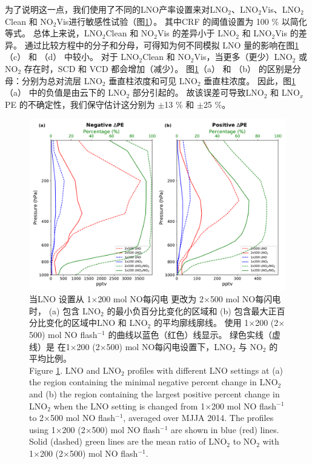为了说明这一点，我们使用了不同的LNO产率设置来对LNO$_2$、LNO$_2$Vis、LNO$_2$Clean 和 NO$_2$Vis进行敏感性试验（图\ref{fig:us_lno2_profile}）。
其中CRF 的阈值设置为 100 \% 以简化等式。
总体上来说，LNO$_2$Clean 和 NO$_2$Vis 的差异小于 LNO$_2$ 和 LNO$_2$Vis 的差异。
通过比较方程中的分子和分母，可得知为何不同模拟 LNO 量的影响在图\ref{fig:us_lno2_profile}（c） 和 （d） 中较小。
对于 LNO$_2$Clean 和 NO$_2$Vis，当更多（更少）LNO$_2$ 或 NO$_2$ 存在时，SCD 和 VCD 都会增加（减少）。
图\ref{fig:us_lno2_profile}（a） 和 （b） 的区别是分母：分别为总对流层 LNO$_2$ 垂直柱浓度和可见 LNO$_2$ 垂直柱浓度。
因此，图\ref{fig:us_lno2_profile}（a） 中的负值是由云下的 LNO$_2$ 部分引起的。
故该误差可导致LNO$_2$ 和 LNO$_x$ PE 的不确定性，我们保守估计这分别为 $\pm$13 \% 和 $\pm$25 \%。

\begin{figure}[!htbp]
\centering
\includegraphics[width=13cm]{./figures/us_lno2_profile.pdf}
\caption{当LNO 设置从 1$\times$200 mol NO每闪电 更改为 2$\times$500 mol NO每闪电 时，
(a) 包含 LNO$_\textrm{2}$ 的最小负百分比变化的区域和 (b) 包含最大正百分比变化的区域中LNO 和 LNO$_\textrm{2}$ 的平均廓线廓线。
使用 1$\times$200 (2$\times$500) mol NO flash$^{-1}$ 的曲线以蓝色（红色）线显示。
绿色实线（虚线）是 在1$\times$200 (2$\times$500) mol NO每闪电设置下，LNO$_\textrm{2}$ 与 NO$_\textrm{2}$ 的平均比例。\\
Figure \ref{fig:us_lno2_profile}. LNO and LNO$_\textrm{2}$ profiles with different LNO settings at (a) the region containing the minimal negative percent change in LNO$_\textrm{2}$ and (b) the region containing the largest positive percent change in LNO$_\textrm{2}$ when the LNO setting is changed from 1$\times$200 mol NO flash$^{-1}$ to 2$\times$500 mol NO flash$^{-1}$, averaged over MJJA 2014.
The profiles using 1$\times$200 (2$\times$500) mol NO flash$^{-1}$ are shown in blue (red) lines.
Solid (dashed) green lines are the mean ratio of LNO$_\textrm{2}$ to NO$_\textrm{2}$ with 1$\times$200 (2$\times$500) mol NO flash$^{-1}$.}
\label{fig:us_lno2_profile}
\end{figure}


